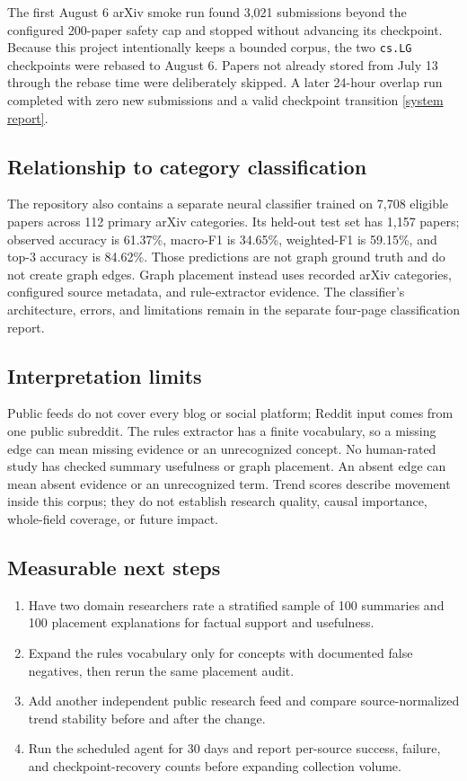 \documentclass[10pt]{article}
\newcommand{\reposource}[2]{\href{#1}{\textcolor{reportblue}{[#2]}}}
\begin{document}
The first August 6 arXiv smoke run found 3,021 submissions beyond the configured
200-paper safety cap and stopped without advancing its checkpoint. Because this
project intentionally keeps a bounded corpus, the two \texttt{cs.LG}
checkpoints were rebased to August 6. Papers not already stored from July 13
through the rebase time were deliberately skipped. A later 24-hour overlap run
completed with zero new submissions and a valid checkpoint transition
\reposource{https://github.com/garyzhang1006/paper-fetcher/blob/main/docs/PROJECT_1_SYSTEM_REPORT.md}{system report}.

\subsection{Relationship to category classification}

The repository also contains a separate neural classifier trained on 7,708
eligible papers across 112 primary arXiv categories. Its held-out test set has
1,157 papers; observed accuracy is 61.37\%, macro-F1 is 34.65\%, weighted-F1 is
59.15\%, and top-3 accuracy is 84.62\%. Those predictions are not graph ground
truth and do not create graph edges. Graph placement instead uses recorded
arXiv categories, configured source metadata, and rule-extractor evidence. The
classifier's architecture, errors, and limitations remain in the separate
four-page classification report.

\subsection{Interpretation limits}

Public feeds do not cover every blog or social platform; Reddit input comes
from one public subreddit. The rules extractor has a finite vocabulary, so a
missing edge can mean missing evidence or an unrecognized concept. No
human-rated study has checked summary usefulness or graph placement. An absent
edge can mean absent evidence or an unrecognized term. Trend scores describe
movement inside this corpus; they do not establish research quality, causal
importance, whole-field coverage, or future impact.

\subsection{Measurable next steps}

\begin{enumerate}[nosep,leftmargin=*]
  \item Have two domain researchers rate a stratified sample of 100 summaries
  and 100 placement explanations for factual support and usefulness.
  \item Expand the rules vocabulary only for concepts with documented false
  negatives, then rerun the same placement audit.
  \item Add another independent public research feed and compare source-normalized
  trend stability before and after the change.
  \item Run the scheduled agent for 30 days and report per-source success,
  failure, and checkpoint-recovery counts before expanding collection volume.
\end{enumerate}
\end{document}
